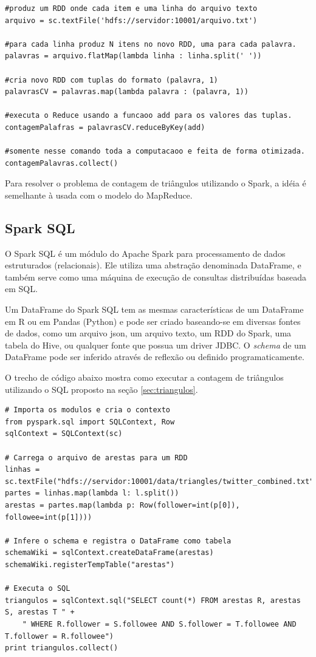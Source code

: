 \begin{lstlisting}[style=MyPythonStyle]
#produz um RDD onde cada item e uma linha do arquivo texto
arquivo = sc.textFile('hdfs://servidor:10001/arquivo.txt') 

#para cada linha produz N itens no novo RDD, uma para cada palavra.
palavras = arquivo.flatMap(lambda linha : linha.split(' ')) 

#cria novo RDD com tuplas do formato (palavra, 1)
palavrasCV = palavras.map(lambda palavra : (palavra, 1)) 

#executa o Reduce usando a funcaoo add para os valores das tuplas.
contagemPalafras = palavrasCV.reduceByKey(add) 

#somente nesse comando toda a computacaoo e feita de forma otimizada.
contagemPalavras.collect() 
\end{lstlisting}

Para resolver o problema de contagem de triângulos utilizando o Spark, a idéia é semelhante à usada com o modelo do MapReduce.

\subsection{Spark SQL}
O Spark SQL é um módulo do Apache Spark para processamento de dados estruturados (relacionais). Ele utiliza uma abstração denominada DataFrame, e também serve como uma máquina de execução de consultas distribuídas baseada em SQL. 

Um DataFrame do Spark SQL tem as mesmas características de um DataFrame em R ou em Pandas (Python) e pode ser criado baseando-se em diversas fontes de dados, como um arquivo json, um arquivo texto, um RDD do Spark, uma tabela do Hive, ou qualquer fonte que possua um driver JDBC. O \textit{schema} de um DataFrame pode ser inferido através de reflexão ou definido programaticamente. 

O trecho de código abaixo mostra como executar a contagem de triângulos utilizando o SQL proposto na seção \ref{sec:triangulos}.

\begin{lstlisting}[style=MyPythonStyle]
# Importa os modulos e cria o contexto
from pyspark.sql import SQLContext, Row
sqlContext = SQLContext(sc)

# Carrega o arquivo de arestas para um RDD
linhas = sc.textFile("hdfs://servidor:10001/data/triangles/twitter_combined.txt")
partes = linhas.map(lambda l: l.split())
arestas = partes.map(lambda p: Row(follower=int(p[0]), followee=int(p[1])))

# Infere o schema e registra o DataFrame como tabela
schemaWiki = sqlContext.createDataFrame(arestas)
schemaWiki.registerTempTable("arestas")

# Executa o SQL
triangulos = sqlContext.sql("SELECT count(*) FROM arestas R, arestas S, arestas T " +
    " WHERE R.follower = S.followee AND S.follower = T.followee AND T.follower = R.followee")
print triangulos.collect()
\end{lstlisting}


